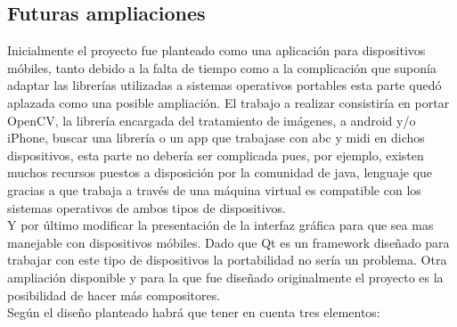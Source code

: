 \subsection{Futuras ampliaciones}

Inicialmente el proyecto fue planteado como una aplicación para dispositivos móbiles, tanto debido a la falta de tiempo como a la complicación que suponía adaptar las librerías utilizadas a sistemas operativos portables esta parte quedó aplazada como una posible ampliación.
\newline
El trabajo a realizar consistiría en portar OpenCV, la librería encargada del tratamiento de imágenes, a android y/o iPhone, buscar una librería o un app que trabajase con abc y midi en dichos dispositivos, esta parte no debería ser complicada pues, por ejemplo, existen muchos recursos puestos a disposición por la comunidad de java, lenguaje que gracias a que trabaja a través de una máquina virtual es compatible con los sistemas operativos de ambos tipos de dispositivos.
\\Y por último modificar la presentación de la interfaz gráfica para que sea mas manejable con dispositivos móbiles. Dado que Qt es un framework diseñado para trabajar con este tipo de dispositivos la portabilidad no sería un problema.
\newline
Otra ampliación disponible y para la que fue diseñado originalmente el proyecto es la posibilidad de hacer más compositores.
\\Según el diseño planteado habrá que tener en cuenta tres elementos:

